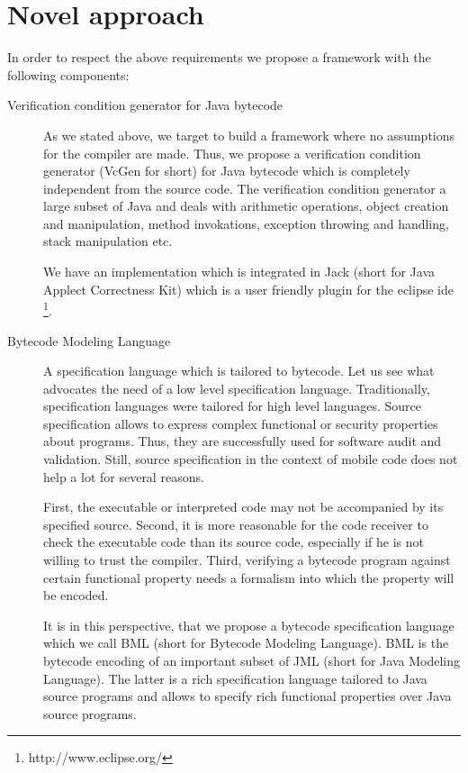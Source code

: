 \section{Novel approach}
In order to respect the above requirements we propose a framework with the following components:
\begin{description}
   \item [Verification condition generator for Java bytecode]
         As we stated above, we target to build a framework where no assumptions for the compiler are made.
	 Thus, we propose a verification condition generator (VcGen for short) for Java bytecode which is completely independent from 
	 the source code. The verification condition generator a large subset of Java and deals with
	 arithmetic operations, object creation and manipulation,
	 method invokations, exception throwing and handling, stack manipulation etc. 
	 
	 We have an implementation which is integrated in Jack (short for Java Applect Correctness Kit) \cite{BRL-JACK} which is a user friendly 
	 plugin for the eclipse ide \footnote{http://www.eclipse.org/}. 
	 
   \item [Bytecode Modeling Language] 
         A specification language which is tailored to bytecode. Let us see what advocates the need of a
	 low level specification language. Traditionally, specification languages were tailored for high level languages.  
	 Source  specification allows to express complex functional or security properties about programs.
	 Thus, they are successfully  used for software audit and validation. Still, source specification in 
	 the context of mobile code does not help a lot for several reasons.


	 First, the executable or interpreted code  may not be accompanied by its specified  source. Second, it is more reasonable for the 
	 code receiver to check the executable code than its source code, especially if he is not willing to trust the compiler.
	 Third, verifying a bytecode program against certain functional property needs a formalism into which the property will be encoded. 


	 It is in this perspective, that we propose  a bytecode specification language which we call BML (short for Bytecode Modeling Language). 
	 BML is the bytecode encoding of an important subset of  JML (short for Java Modeling Language). The latter is a rich specification language tailored to Java source programs and
	 allows to specify rich functional properties over Java source programs.



\end{description}
